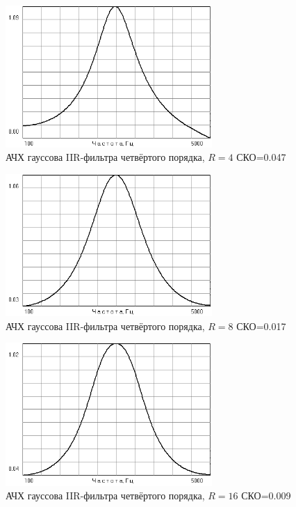 \documentclass[a4paper,14pt]{extarticle}
\begin{document}
\begin{figure}[H]
  \centering
  \includegraphics[width=0.7\textwidth]{Z1_GAUSS/gauss_IIR_4p_R4.png}
  \caption{АЧХ гауссова IIR-фильтра четвёртого порядка, $R=4$ СКО=0.047}
  \label{fig:}
\end{figure}
\begin{figure}[H]
  \centering
  \includegraphics[width=0.7\textwidth]{Z1_GAUSS/gauss_IIR_4p_R8.png}
  \caption{АЧХ гауссова IIR-фильтра четвёртого порядка, $R=8$ СКО=0.017}
  \label{fig:}
\end{figure}
\begin{figure}[H]
  \centering
  \includegraphics[width=0.7\textwidth]{Z1_GAUSS/gauss_IIR_4p_R16.png}
  \caption{АЧХ гауссова IIR-фильтра четвёртого порядка, $R=16$ СКО=0.009}
  \label{fig:}
\end{figure}
\end{document}
